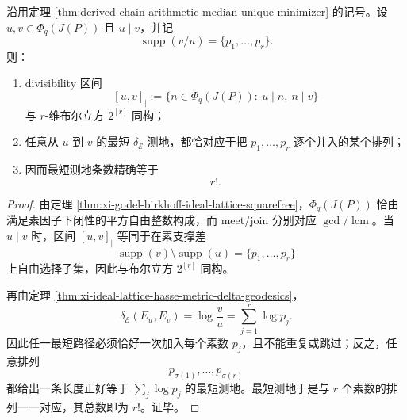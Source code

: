 \begin{corollary}[平方自由投影区间的布尔立方结构与测地计数]\label{cor:derived-chain-arithmetic-boolean-interval-geodesics}
沿用定理 \ref{thm:derived-chain-arithmetic-median-unique-minimizer} 的记号。设 \(u,v\in \Phi_q(J(P))\) 且 \(u\mid v\)，并记
\[
\operatorname{supp}(v/u)=\{p_1,\dots,p_r\}.
\]
则：
\begin{enumerate}
  \item divisibility 区间
  \[
  [u,v]_{\mid}:=
  \{n\in \Phi_q(J(P)):\ u\mid n,\ n\mid v\}
  \]
  与 \(r\)-维布尔立方 \(2^{[r]}\) 同构；
  \item 任意从 \(u\) 到 \(v\) 的最短 \(\delta_{\mathcal E}\)-测地，都恰对应于把 \(p_1,\dots,p_r\) 逐个并入的某个排列；
  \item 因而最短测地条数精确等于
  \[
  r!.
  \]
\end{enumerate}
\end{corollary}
\begin{proof}
由定理 \ref{thm:xi-godel-birkhoff-ideal-lattice-squarefree}，\(\Phi_q(J(P))\) 恰由满足素因子下闭性的平方自由整数构成，而 meet/join 分别对应 \(\gcd/\operatorname{lcm}\)。当 \(u\mid v\) 时，区间 \([u,v]_{\mid}\) 等同于在素支撑差
\[
\operatorname{supp}(v)\setminus \operatorname{supp}(u)=\{p_1,\dots,p_r\}
\]
上自由选择子集，因此与布尔立方 \(2^{[r]}\) 同构。

再由定理 \ref{thm:xi-ideal-lattice-hasse-metric-delta-geodesics}，
\[
\delta_{\mathcal E}(E_u,E_v)
=
\log\frac{v}{u}
=
\sum_{j=1}^{r}\log p_j.
\]
因此任一最短路径必须恰好一次加入每个素数 \(p_j\)，且不能重复或跳过；反之，任意排列
\[
p_{\sigma(1)},\dots,p_{\sigma(r)}
\]
都给出一条长度正好等于 \(\sum_j\log p_j\) 的最短测地。最短测地于是与 \(r\) 个素数的排列一一对应，其总数即为 \(r!\)。证毕。
\end{proof}
